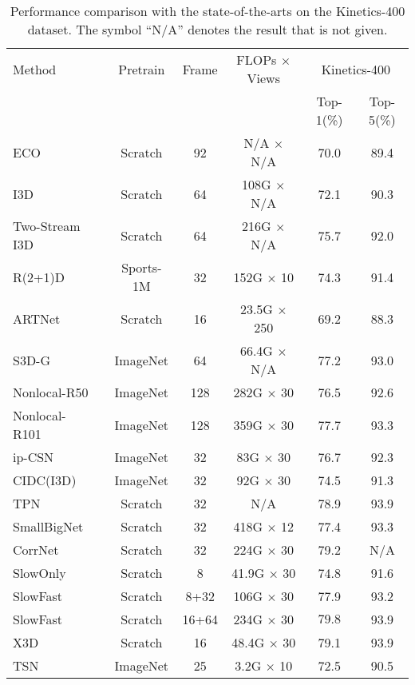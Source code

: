 \documentclass[journal]{IEEEtran}
\begin{document}
\begin{table*}
\caption{Performance comparison with the state-of-the-arts on the Kinetics-400 dataset. The symbol ``N/A” denotes the result that is not given.}
\label{tab:sotak}
\centering
\begin{tabular}{l|c|c|c|c|c}
\hline
Method                            & Pretrain   & Frame & FLOPs $\times$ Views   & \multicolumn{2}{c}{Kinetics-400}  \\
                                      &  &       &                            & Top-1(\%)          & Top-5(\%)           \\ \hline
ECO~\cite{zolfaghari2018eco}  & Scratch  & 92    & N/A $\times$ N/A             & 70.0         & 89.4                       \\
I3D~\cite{carreira2017quo}            &  Scratch      & 64       & 108G $\times$ N/A  & 72.1  & 90.3 \\
Two-Stream I3D~\cite{carreira2017quo} &  Scratch      & 64       & 216G $\times$ N/A  & 75.7  & 92.0 \\
R(2+1)D~\cite{tran2018closer}  & Sports-1M & 32     & 152G $\times$ 10    & 74.3           & 91.4          \\
ARTNet~\cite{wang2018appearance}  &  Scratch      & 16        & 23.5G $\times$ 250    & 69.2  & 88.3 \\
S3D-G~\cite{xie2018rethinking}  &   ImageNet       & 64       & 66.4G $\times$ N/A & 77.2  & 93.0 \\
Nonlocal-R50~\cite{NonLocal2018}       &   ImageNet       & 128       & 282G $\times$ 30  & 76.5  & 92.6 \\
Nonlocal-R101~\cite{NonLocal2018}       &   ImageNet       & 128       & 359G $\times$ 30       & 77.7  & 93.3 \\
ip-CSN~\cite{tran2019video}       &   ImageNet       & 32       & 83G $\times$ 30    & 76.7  & 92.3 \\
CIDC(I3D)~\cite{li2020directional}  & ImageNet & 32    & 92G $\times$ 30      & 74.5           & 91.3 \\
TPN~\cite{yang2020temporal}     &  Scratch      & 32        & N/A       & 78.9  & 93.9 \\
SmallBigNet~\cite{li2020smallbignet}  & Scratch       &32       &  418G $\times$ 12    & 77.4  & 93.3 \\
CorrNet~\cite{wang2020video}   &Scratch           & 32    & 224G $\times$ 30       & 79.2           & N/A           \\
SlowOnly~\cite{feichtenhofer2019slowfast}     &  Scratch     &8        & 41.9G $\times$ 30      & 74.8  & 91.6 \\
SlowFast~\cite{feichtenhofer2019slowfast}     &  Scratch      &8+32        & 106G $\times$ 30    & 77.9  & 93.2 \\
SlowFast~\cite{feichtenhofer2019slowfast}     &  Scratch      &16+64        & 234G $\times$ 30   & $\mathbf{79.8}$  & 93.9 \\
X3D~\cite{feichtenhofer2020x3d}       &  Scratch      &16        & 48.4G $\times$ 30      & 79.1  & 93.9 \\
\hline
TSN~\cite{wang2016temporal}  & ImageNet & 25     & 3.2G $\times$ 10       & 72.5           & 90.5          \\



\end{tabular}
\end{table*}
\end{document}
